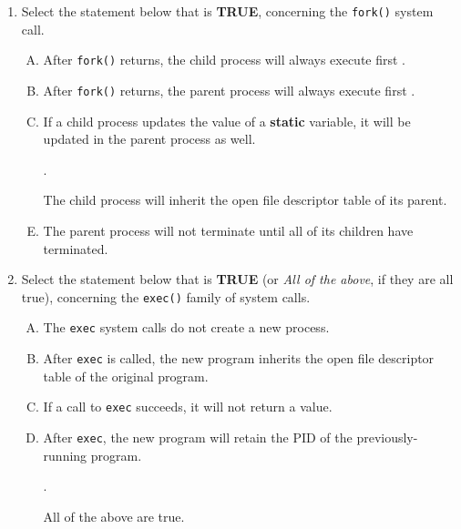 \documentclass[11pt]{article}
\begin{document}
\begin{enumerate}[{1}.1]
	\item Select the statement below that is \textbf{TRUE}, concerning the \Verb|fork()| system call.
		\begin{enumerate}[A.]
			\item After \Verb|fork()| returns, the child process will always execute first .
			\item After \Verb|fork()| returns, the parent process will always execute first .
			\item If a child process updates the value of a \textbf{static} variable, it will be updated in the parent process as well.
			\item[\textcolor{correct}{\addtocounter{enumii}{1}\Alph{enumii}.}] \textcolor{correct}{The child process will inherit the open file descriptor table of its parent.}
			\item The parent process will not terminate until all of its children have terminated.
		\end{enumerate}

	\item Select the statement below that is \textbf{TRUE} (or \textit{All of the above}, if they are all true), concerning the \Verb|exec()| family of system calls.
		\begin{enumerate}[A.]
			\item The \Verb|exec| system calls do not create a new process.
			\item After \Verb|exec| is called, the new program inherits the open file descriptor table of the original
			program.
			\item If a call to \Verb|exec| succeeds, it will not return a value.
			\item After \Verb|exec|, the new program will retain the PID of the previously-running program.
			\item[\textcolor{correct}{\addtocounter{enumii}{1}\Alph{enumii}.}] \textcolor{correct}{All of the above are true.}
		\end{enumerate}


\end{enumerate}
\end{document}
